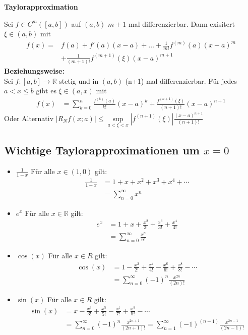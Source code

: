 \documentclass[25pt]{sciposter}
\newcommand{\R}{\mathbb{R}}
\newenvironment{method}[1]{\begin{mdframed}[backgroundcolor=blue!10,innertopmargin=15pt, innerbottommargin=15pt, nobreak=true]
		\textbf{#1 }
	}
	{ 
	\end{mdframed}
}
\begin{document}
\begin{multicols}{3}
\begin{method}{Taylorapproximation}
Sei $f\in C^m ([a,b])$ auf $(a,b)$ $m+1$ mal differenzierbar. Dann exisitert $\xi \in (a,b)$ mit 
\begin{align*}
	f(x) =& f(a) + f'(a)(x-a) + \ldots + \frac{1}{m!} f^{(m)} (a) (x-a)^m\\ &+ \frac{1}{(m+1)!} f^{(m+1)}(\xi) (x-a)^{m+1}
\end{align*} 
 \textbf{Beziehungsweise:}\\
	Sei $f:[a,b] \to \R$ stetig und in $(a,b)$ (n+1) mal differenzierbar. Für jedes $a<x\leq b$ gibt es $\xi \in (a,x)$ mit
	\begin{align*}
	f(x) &= \sum_{k=0}^n \frac{f^{(k)}(a)}{k!} (x-a)^k + \frac{f^{(n+1)}(\xi)}{(n+1)!} (x-a)^{n+1}
	\end{align*}
Oder Alternativ $|R_N f(x;a)| \leq \sup\limits_{a < \xi < x} |f^{(n+1)} (\xi)|  \frac{(x-a)^{n+1}}{(n+1)!}$
\end{method}


\subsection*{Wichtige Taylorapproximationen um $x=0$}
\begin{itemize}
	\item $\boxed{\frac{1}{1-x}}$ Für alle $x \in (1,0)$ gilt:
	\begin{align*}
	{\frac{1}{1-x}} &= 1 + x + x^2 + x^3 + x^4 + \cdots \\
	&= \sum_{n=0}^{\infty} x^n
	\end{align*}	
	
	\item $\boxed{e^x}$ Für alle $x \in \R$ gilt:
	\begin{align*}
		e^x &= 1 + x + \frac{x^2}{2!} + \frac{x^3}{3!} + \frac{x^4}{4!}\\
		&= \sum_{n=0}^{\infty} \frac{x^n}{n!}
	\end{align*}
	
	\item $\boxed{\cos(x)}$ Für alle $x\in R$ gilt:
	\begin{align*}
	\cos(x) &= 1 - \frac{x^2}{2!} + \frac{x^4}{4!} - \frac{x^6}{6!} + \frac{x^8}{8!} - \cdots  \\
	&= \sum_{n=0}^{\infty} (-1)^n \frac{x^{2n}}{(2n)!}
	\end{align*}
	
	\item $\boxed{\sin(x)}$ Für alle $x\in R$ gilt:
	\begin{align*}
	\sin(x) &=  x - \frac{x^3}{3!} + \frac{x^5}{5!} - \frac{x^7}{7!} + \frac{x^9}{9!} - \cdots\\
	&= \sum_{n=0}^{\infty} (-1)^n \frac{x^{2n+1}}{(2n+1)!} = \sum_{n=1}^{\infty} (-1)^{(n-1)} \frac{x^{2n-1}}{(2n-1)!}
	\end{align*}


\end{itemize}
\end{multicols}
\end{document}
